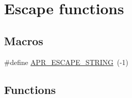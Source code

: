 \hypertarget{group___a_p_r___util___escaping}{\section{Escape functions}
\label{group___a_p_r___util___escaping}
}
\subsection*{Macros}
\begin{DoxyCompactItemize}
\item 
\#define \hyperlink{group___a_p_r___util___escaping_ga793ae1b187ce490c65eeee2eb59d2831}{A\-P\-R\-\_\-\-E\-S\-C\-A\-P\-E\-\_\-\-S\-T\-R\-I\-N\-G}~(-\/1)
\end{DoxyCompactItemize}
\subsection*{Functions}
